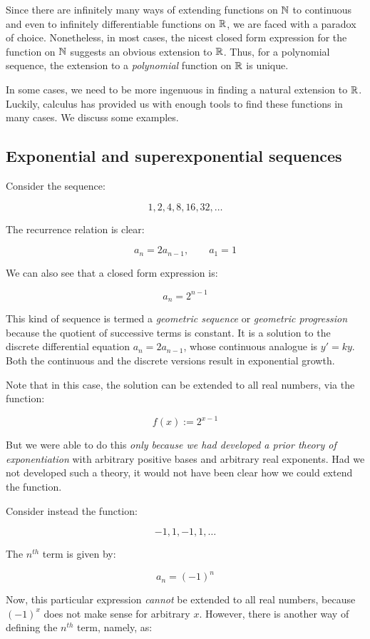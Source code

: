 \documentclass[10pt]{amsart}
\begin{document}
Since there are infinitely many ways of extending functions on $\mathbb{N}$ to
continuous and even to infinitely differentiable functions on $\mathbb{R}$, we
are faced with a paradox of choice. Nonetheless, in most cases, the
nicest closed form expression for the function on $\mathbb{N}$ suggests an
obvious extension to $\mathbb{R}$. Thus, for a polynomial sequence, the
extension to a {\em polynomial} function on $\mathbb{R}$ is unique.

In some cases, we need to be more ingenuous in finding a natural
extension to $\mathbb{R}$. Luckily, calculus has provided us with enough tools
to find these functions in many cases. We discuss some examples.

\subsection{Exponential and superexponential sequences}

Consider the sequence:

$$1,2,4,8,16,32,\dots$$

The recurrence relation is clear:

$$a_n = 2a_{n-1}, \qquad a_1 = 1$$

We can also see that a closed form expression is:

$$a_n = 2^{n-1}$$

This kind of sequence is termed a {\em geometric sequence} or {\em
geometric progression} because the quotient of successive terms is
constant. It is a solution to the discrete differential equation $a_n
= 2a_{n-1}$, whose continuous analogue is $y' = ky$. Both the
continuous and the discrete versions result in exponential growth.

Note that in this case, the solution can be extended to all real
numbers, via the function:

$$f(x) := 2^{x-1}$$

But we were able to do this {\em only because we had developed a prior
theory of exponentiation} with arbitrary positive bases and arbitrary
real exponents. Had we not developed such a theory, it would not have
been clear how we could extend the function.

Consider instead the function:

$$-1,1,-1,1,\dots$$

The $n^{th}$ term is given by:

$$a_n = (-1)^n$$

Now, this particular expression {\em cannot} be extended to all real
numbers, because $(-1)^x$ does not make sense for arbitrary
$x$. However, there is another way of defining the $n^{th}$ term,
namely, as:
\end{document}
